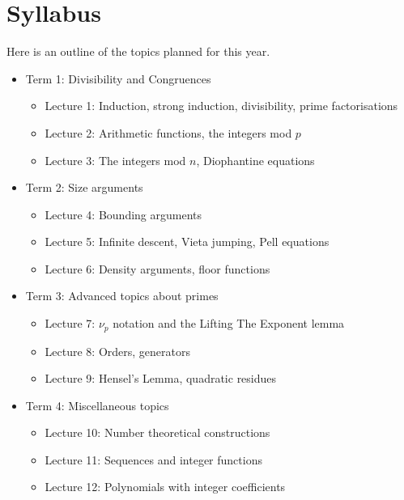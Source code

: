 \documentclass{article}
\begin{document}
\section{Syllabus}
Here is an outline of the topics planned for this year.
\begin{itemize}
  \item Term 1: Divisibility and Congruences
    \begin{itemize}
      \item Lecture 1: Induction, strong induction, divisibility, prime
        factorisations
      \item Lecture 2: Arithmetic functions, the integers mod $p$
      \item Lecture 3: The integers mod $n$, Diophantine equations
    \end{itemize}
  \item Term 2: Size arguments
    \begin{itemize}
      \item Lecture 4: Bounding arguments
      \item Lecture 5: Infinite descent, Vieta jumping, Pell equations
      \item Lecture 6: Density arguments, floor functions
    \end{itemize}
  \item Term 3: Advanced topics about primes
    \begin{itemize}
      \item Lecture 7: $\nu_p$ notation and the Lifting The Exponent lemma
      \item Lecture 8: Orders, generators
      \item Lecture 9: Hensel's Lemma, quadratic residues
    \end{itemize}
  \item Term 4: Miscellaneous topics
    \begin{itemize}
      \item Lecture 10: Number theoretical constructions
      \item Lecture 11: Sequences and integer functions
      \item Lecture 12: Polynomials with integer coefficients
    \end{itemize}
\end{itemize}
\end{document}
